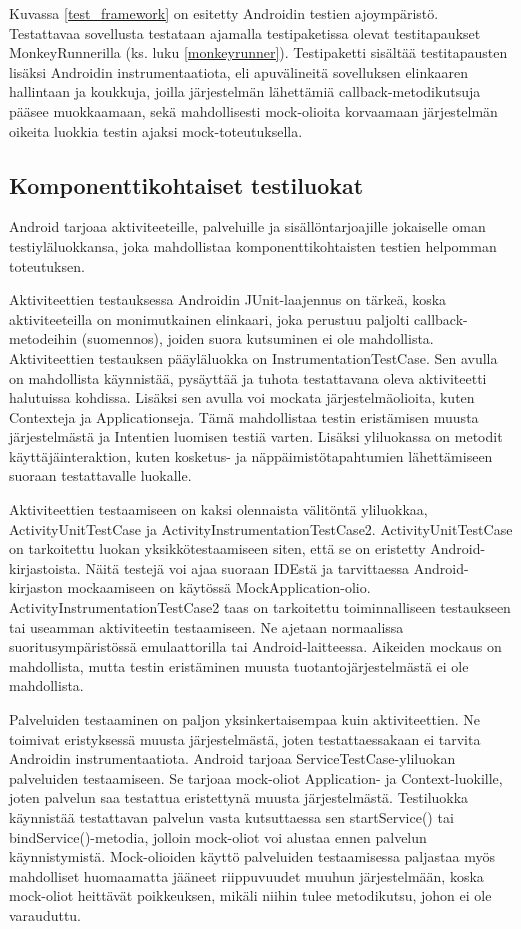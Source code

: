 Kuvassa \ref{test_framework} on esitetty Androidin testien ajoympäristö. Testattavaa sovellusta testataan ajamalla testipaketissa olevat testitapaukset MonkeyRunnerilla (ks. luku \ref{monkeyrunner}). Testipaketti sisältää testitapausten lisäksi Androidin instrumentaatiota, eli apuvälineitä sovelluksen elinkaaren hallintaan ja koukkuja, joilla järjestelmän lähettämiä callback-metodikutsuja pääsee muokkaamaan, sekä mahdollisesti mock-olioita korvaamaan järjestelmän oikeita luokkia testin ajaksi mock-toteutuksella. \cite{android}

\subsection{Komponenttikohtaiset testiluokat}

Android tarjoaa aktiviteeteille, palveluille ja sisällöntarjoajille jokaiselle oman testiyläluokkansa, joka mahdollistaa komponenttikohtaisten testien helpomman toteutuksen.

Aktiviteettien testauksessa Androidin JUnit-laajennus on tärkeä, koska aktiviteeteilla on monimutkainen elinkaari, joka perustuu paljolti callback-metodeihin (suomennos), joiden suora kutsuminen ei ole mahdollista. Aktiviteettien testauksen pääyläluokka on InstrumentationTestCase. Sen avulla on mahdollista käynnistää, pysäyttää ja tuhota testattavana oleva aktiviteetti halutuissa kohdissa. Lisäksi sen avulla voi mockata järjestelmäolioita, kuten Contexteja ja Applicationseja. Tämä mahdollistaa testin eristämisen muusta järjestelmästä ja Intentien luomisen testiä varten. Lisäksi yliluokassa on metodit käyttäjäinteraktion, kuten kosketus- ja näppäimistötapahtumien lähettämiseen suoraan testattavalle luokalle.

Aktiviteettien testaamiseen on kaksi olennaista välitöntä yliluokkaa, ActivityUnitTestCase ja ActivityInstrumentationTestCase2. ActivityUnitTestCase on tarkoitettu luokan yksikkötestaamiseen siten, että se on eristetty Android-kirjastoista. Näitä testejä voi ajaa suoraan IDEstä ja tarvittaessa Android-kirjaston mockaamiseen on käytössä MockApplication-olio. ActivityInstrumentationTestCase2 taas on tarkoitettu toiminnalliseen testaukseen tai useamman aktiviteetin testaamiseen. Ne ajetaan normaalissa suoritusympäristössä emulaattorilla tai Android-laitteessa. Aikeiden mockaus on mahdollista, mutta testin eristäminen muusta tuotantojärjestelmästä ei ole mahdollista.

Palveluiden testaaminen on paljon yksinkertaisempaa kuin aktiviteettien. Ne toimivat eristyksessä muusta järjestelmästä, joten testattaessakaan ei tarvita Androidin instrumentaatiota. Android tarjoaa ServiceTestCase-yliluokan palveluiden testaamiseen. Se tarjoaa mock-oliot Application- ja Context-luokille, joten palvelun saa testattua eristettynä muusta järjestelmästä. Testiluokka käynnistää testattavan palvelun vasta kutsuttaessa sen startService() tai bindService()-metodia, jolloin mock-oliot voi alustaa ennen palvelun käynnistymistä. Mock-olioiden käyttö palveluiden testaamisessa paljastaa myös mahdolliset huomaamatta jääneet riippuvuudet muuhun järjestelmään, koska mock-oliot heittävät poikkeuksen, mikäli niihin tulee metodikutsu, johon ei ole varauduttu.

